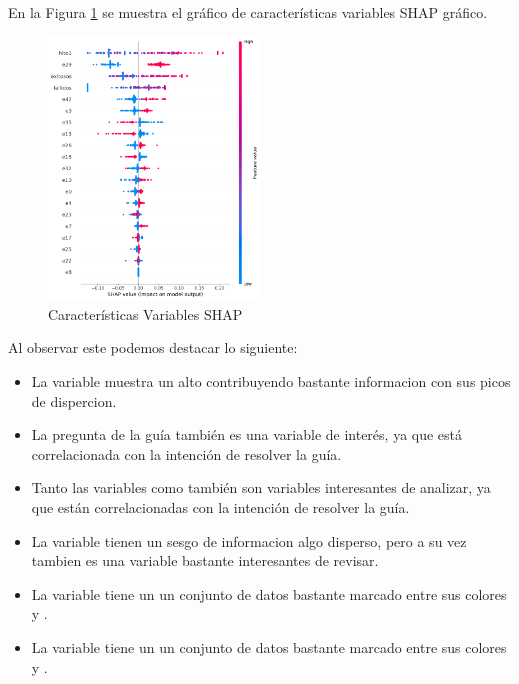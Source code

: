 En la Figura \ref{fig:caract_var_shap} se muestra el gráfico de características variables SHAP gráfico.



    \begin{figure}[H]
        \centering
        \includegraphics[width=0.5\textwidth]{img/shap_rf/shapForcePlot2.png}
        \caption{Características Variables SHAP}
        \label{fig:caract_var_shap}
    \end{figure}

Al observar este podemos destacar lo siguiente:

\begin{itemize}
    \item La variable   muestra un alto  contribuyendo bastante informacion con sus picos de dispercion.
    \item La pregunta de la guía  también es una variable de interés, ya que está correlacionada con la intención de resolver la guía.
    \item Tanto las variables  como  también son variables interesantes de analizar, ya que están correlacionadas con la intención de resolver la guía.
    \item La variable  tienen un sesgo de informacion algo disperso, pero a su vez tambien es una variable bastante interesantes de revisar.
    \item La variable  tiene un un conjunto de datos bastante marcado entre  sus colores  y .
    \item La variable  tiene un un conjunto de datos bastante marcado entre  sus colores  y .
\end{itemize}

